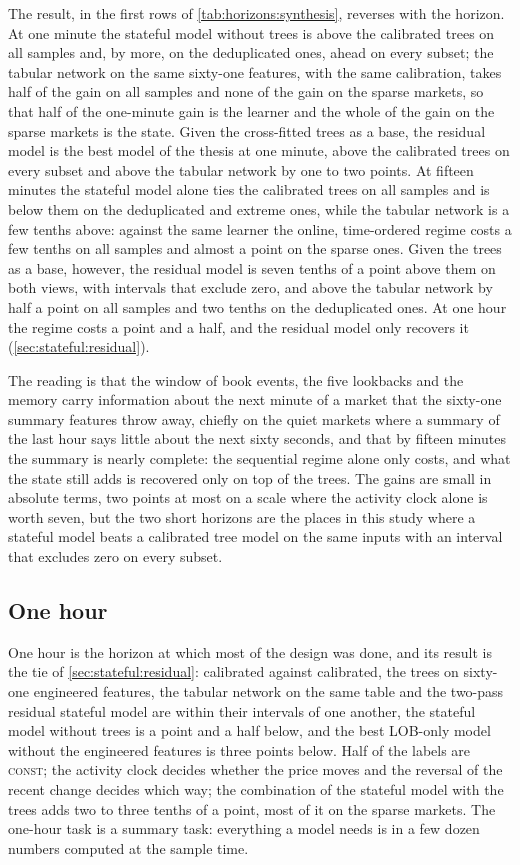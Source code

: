 The result, in the first rows of \cref{tab:horizons:synthesis}, reverses with the horizon.
At one minute the stateful model without trees is above the calibrated trees on all samples
and, by more, on the deduplicated ones, ahead on every subset; the tabular network on the
same sixty-one features, with the same calibration, takes half of the gain on all samples
and none of the gain on the sparse markets, so that half of the one-minute gain is the
learner and the whole of the gain on the sparse markets is the state.  Given the
cross-fitted trees as a base, the residual model is the best model of the thesis at one
minute, above the calibrated trees on every subset and above the tabular network by one to
two points.  At fifteen minutes the stateful model alone ties the calibrated trees on all
samples and is below them on the deduplicated and extreme ones, while the tabular network
is a few tenths above: against the same learner the online, time-ordered regime costs a few
tenths on all samples and almost a point on the sparse ones.  Given the trees as a base,
however, the residual model is seven tenths of a point above them on both views, with
intervals that exclude zero, and above the tabular network by half a point on all samples
and two tenths on the deduplicated ones.  At one hour the
regime costs a point and a half, and the residual model only recovers it
(\cref{sec:stateful:residual}).

The reading is that the window of book events, the five lookbacks and the memory carry
information about the next minute of a market that the sixty-one summary features throw
away, chiefly on the quiet markets where a summary of the last hour says little about the
next sixty seconds, and that by fifteen minutes the summary is nearly complete: the
sequential regime alone only costs, and what the state still adds is recovered only on top
of the trees.  The gains are small in absolute terms, two points at most on a scale where the
activity clock alone is worth seven, but the two short horizons are the places in this study
where a stateful model beats a calibrated tree model on the same inputs with an interval
that excludes zero on every subset.

\subsection{One hour}
\label{sec:horizons:1h}

One hour is the horizon at which most of the design was done, and its result is the tie of
\cref{sec:stateful:residual}: calibrated against calibrated, the trees on sixty-one
engineered features, the tabular network on the same table and the two-pass residual
stateful model are within their intervals of one another, the stateful model without trees
is a point and a half below, and the best LOB-only model without the engineered features
is three points below.  Half of the labels are \textsc{const}; the activity clock decides
whether the price moves and the reversal of the recent change decides which way; the
combination of the stateful model with the trees adds two to three tenths of a point, most
of it on the sparse markets.  The one-hour task is a summary task: everything a model needs
is in a few dozen numbers computed at the sample time.

